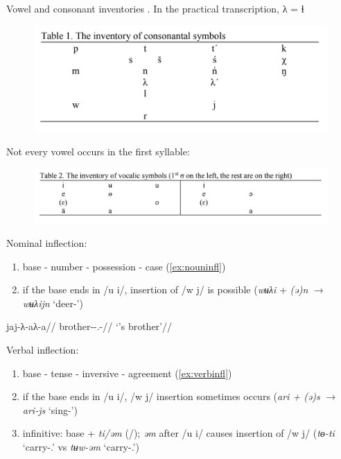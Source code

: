 \documentclass[a4paper, 12pt]{article}
\begin{document}
	\noindent Vowel and consonant inventories \parencite{lketal2018}. In the practical transcription, λ = ɬ
	
	\begin{figure}[H]
		\includegraphics[scale=.66]{consonants}
	\end{figure}
	
	\newpage
	\noindent Not every vowel occurs in the first syllable:
	
	\begin{figure}[H]
		\includegraphics[scale=.66]{vowels}
	\end{figure}
		
	\noindent Nominal inflection:

\begin{enumerate}[$\gg$]
	\item base - number - possession - case (\ref{ex:nouninfl})
	\item if the base ends in /u i/, insertion of /w j/ is possible (\emph{wʉλi} + \emph{(ə)n} $\rightarrow$ \emph{wʉλijn} `deer-{\Loc}')
\end{enumerate}

\ex
\begingl\label{ex:nouninfl}
	\gla jaj-λ-aλ-a//
	\glb brother-{\Pl}-{\Poss}.{\Tsg}-{\Dat}//
	\glft `{\Tsg}'s brother'//
\endgl
\xe

	\noindent Verbal inflection:

\begin{enumerate}[$\gg$]
	\item base - tense - inversive - agreement (\ref{ex:verbinfl})
	\item if the base ends in /u i/, /w j/ insertion sometimes occurs (\emph{ari + (ə)s} $\rightarrow$ \emph{ari-js} `sing-{\Pst}')
	\item infinitive: base + \emph{ti/əm} ({\Npst}/{\Pst}); \emph{əm} after /u i/ causes insertion of /w j/ (\emph{tɵ-ti} `carry-{\Nfin}.{\Npst}' vs \emph{tʉw-əm} `carry-{\Nfin}.{\Pst}')
\end{enumerate}
\end{document}
